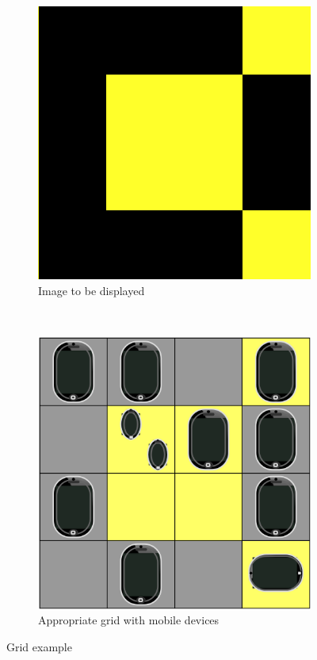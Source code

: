 \begin{figure}[h]
        \centering
        \begin{subfigure}[b]{0.4\textwidth}
                \includegraphics[width=\textwidth]{introduction/grid_d.png}
                \caption{Image to be displayed}
                \label{fig:grid_d}
        \end{subfigure}
        ~ %
        \begin{subfigure}[b]{0.4\textwidth}
                \includegraphics[width=\textwidth]{introduction/grid_mobiles.png}
                \caption{Appropriate grid with mobile devices}
                \label{fig:grid_mobiles}
        \end{subfigure}
        \caption{Grid example}\label{fig:grid}
\end{figure}